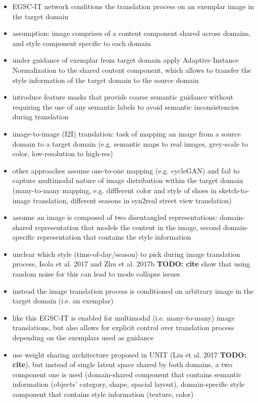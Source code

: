 \documentclass[]{article}
\newcommand{\todo}[1]{{\color{red}\bf{TODO: #1}}}
\begin{document}
\begin{itemize}
	\item EGSC-IT network conditions the translation process on an exemplar image in the target domain
	\item assumption: image comprises of a content component shared across domains, and style component specific to each domain
	\item under guidance of exemplar from target domain apply Adaptive Instance Normalization to the shared content component, which allows to transfer the style information of the target domain to the source domain
	\item introduce feature masks that provide coarse semantic guidance without requiring the use of any semantic labels to avoid semantic inconsistencies during translation
	\item image-to-image (I2I) translation: task of mapping an image from a source domain to a target domain (e.g. semantic maps to real images, grey-scale to color, low-resolution to high-res)
	\item other approaches assume one-to-one mapping (e.g. cycleGAN) and fail to capture multimodal nature of image distribution within the target domain (many-to-many mapping, e.g. diffferent color and style of shoes in sketch-to-image translation, different seasons in syn2real street view translation)
	\item assume an image is composed of two disentangled representations: domain-shared representation that models the content in the image, second domain-specific representation that contains the style information
	\item unclear which style (time-of-day/season) to pick during image translation process, Isola et al. 2017 and Zhu et al. 2017b \todo{cite} show that using random noise for this can lead to mode collapse issues
	\item instead the image translation process is conditioned on arbitrary image in the target domain (i.e. an exemplar)
	\item like this EGSC-IT is enabled for multimodal (i.e. many-to-many) image translations, but also allows for explicit control over translation process depending on the exemplars used as guidance
	\item use weight sharing architecture proposed in UNIT (Liu et al. 2017 \todo{cite}), but instead of single latent space shared by both domains, a two component one is used (domain-shared component that contains semantic information (objects' category, shape, spacial layout), domain-specific style component that contains style information (texture, color)

\end{itemize}
\end{document}
